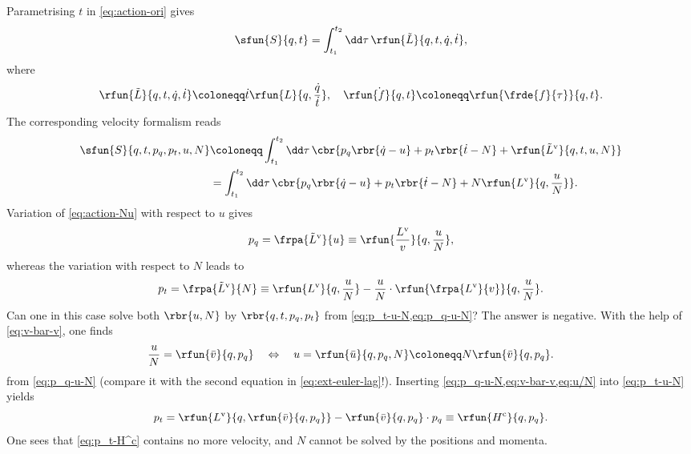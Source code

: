 \documentclass[a4paper]{article}
\begin{document}
Parametrising $t$ in \cref{eq:action-ori} gives
\begin{equation}
\sfun{S}{q, t} = \int_{t_1}^{t_2} \dd \tau\,\rfun{\tilde L}{q, t, \dot 
q, \dot t},
\end{equation}
where
\begin{equation}
\rfun{\tilde L}{q, t, \dot q, \dot t} \coloneqq \dot t \rfun{L}{q, 
\frac{\dot q}{\dot t}},\quad
\dot \rfun{f}{q,t} \coloneqq \rfun{\frde{f}{\tau}}{q,t}.
\end{equation}
The corresponding velocity formalism reads
\begin{align}
\sfun{S}{q, t, p_q, p_t, u, N} &\coloneqq \int_{t_1}^{t_2}\dd \tau\,
\cbr{p_q\rbr{\dot q-u}+p_t\rbr{\dot t-N} +
\rfun{\tilde L^\text{v}}{q, t, u, N}} \nonumber \\
&=\int_{t_1}^{t_2}\dd \tau\,
\cbr{p_q\rbr{\dot q-u}+p_t\rbr{\dot t-N} +
N \rfun{L^\text{v}}{q, \frac{u}{N}}}.
\label{eq:action-Nu}
\end{align}
Variation of \cref{eq:action-Nu} with respect to $u$ gives
\begin{equation}
p_q = \frpa{\tilde L^\text{v}}{u} \equiv
\rfun{\frac{L^\text{v}}{v}}{q, \frac{u}{N}},
\label{eq:p_q-u-N}
\end{equation}
whereas the variation with respect to $N$ leads to
\begin{equation}
p_t = \frpa{\tilde L^\text{v}}{N} \equiv
\rfun{L^\text{v}}{q, \frac{u}{N}} - \frac{u}{N}\cdot
\rfun{\frpa{L^\text{v}}{v}}{q,\frac{u}{N}}.
\label{eq:p_t-u-N}
\end{equation}
Can one in this case solve both $\rbr{u, N}$ by $\rbr{q, t, p_q, p_t}$ from 
\cref{eq:p_t-u-N,eq:p_q-u-N}? The answer is negative. With the help of 
\cref{eq:v-bar-v}, one finds
\begin{equation}
\frac{u}{N} = \rfun{\bar v}{q, p_q} \quad \Leftrightarrow \quad
u = \rfun{\bar u}{q, p_q, N} \coloneqq N \rfun{\bar v}{q, p_q}.
\label{eq:u/N}
\end{equation}
from \cref{eq:p_q-u-N} (compare it with the second equation in 
\cref{eq:ext-euler-lag}!). Inserting \cref{eq:p_q-u-N,eq:v-bar-v,eq:u/N} into
\cref{eq:p_t-u-N} yields
\begin{equation}
p_t = \rfun{L^\text{v}}{q, \rfun{\bar v}{q, p_q}} -
\rfun{\bar v}{q, p_q}\cdot p_q
\equiv \rfun{H^\text{c}}{q, p_q}.
\label{eq:p_t-H^c}
\end{equation}
One sees that \cref{eq:p_t-H^c} contains no more velocity, and $N$ cannot be 
solved by the positions and momenta.
\end{document}
